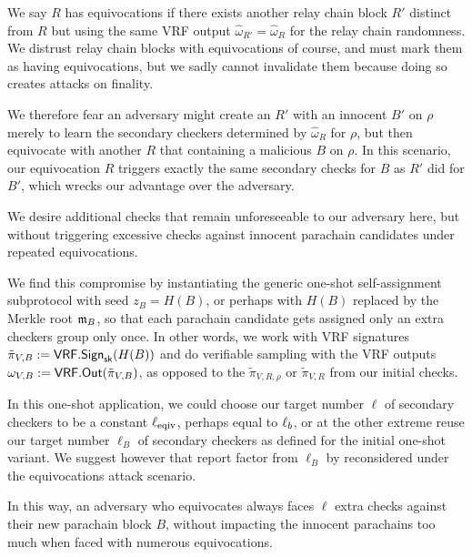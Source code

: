 \begin{enumerate}
\begin{enumerate}

We say $R$ has equivocations if there exists another relay chain block $R'$ distinct from $R$ but using the same VRF output $\hat{\omega}_{R'} = \hat{\omega}_R$ for the relay chain randomness.  We distrust relay chain blocks with equivocations of course, and must mark them as having equivocations, but we sadly cannot invalidate them because doing so creates attacks on finality. 

We therefore fear an adversary might create an $R'$ with an innocent $B'$ on $\rho$ merely to learn the secondary checkers determined by $\hat{\omega}_R$ for $\rho$, but then equivocate with another $R$ that containing a malicious $B$ on $\rho$.  In this scenario, our equivocation $R$ triggers exactly the same secondary checks for $B$ as $R'$ did for $B'$, which wrecks our advantage over the adversary.

We desire additional checks that remain unforeseeable to our adversary here, but without triggering excessive checks against innocent parachain candidates under repeated equivocations.     

We find this compromise by instantiating the generic one-shot self-assignment subprotocol with seed $z_B = H(B)$, or perhaps with $H(B)$ replaced by the Merkle root $\mathfrak{m}_B$, so that each parachain candidate gets assigned only an extra checkers group only once.  In other words, we work with VRF signatures $\tilde{\pi}_{V,B} := \mathsf{VRF}.\mathsf{Sign}_{\mathsf{sk}}(H(B))$ and do verifiable sampling with the VRF outputs $\omega_{V,B} := \mathsf{VRF}.\mathsf{Out}(\tilde{\pi}_{V,B})$, as opposed to the $\tilde{\pi}_{V,R,\rho}$ or $\tilde{\pi}_{V,R}$ from our initial checks.

In this one-shot application, we could choose our target number $\ell$ of secondary checkers to be a constant $\ell_{\mathrm{eqiv}}$, perhaps equal to $\ell_b$, or at the other extreme reuse our target number $\ell_B$ of secondary checkers as defined for the initial one-shot variant.  We suggest however that report factor from $\ell_B$ by reconsidered under the equivocations attack scenario.

In this way, an adversary who equivocates always faces $\ell$ extra checks against their new parachain block $B$, without impacting the innocent parachains too much when faced with numerous equivocations.


\end{enumerate}
\end{enumerate}
